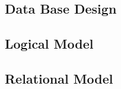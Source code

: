\documentclass[a4paper,10pt,toc=graduated]{article}
\begin{document}
\newpage
\begin{appendices}
\section{Data Base Design}
\subsection{Logical Model}
\begin{center}
\end{center}
\subsection{Relational Model}
\begin{center}
\end{center}

\end{appendices}
\end{document}
